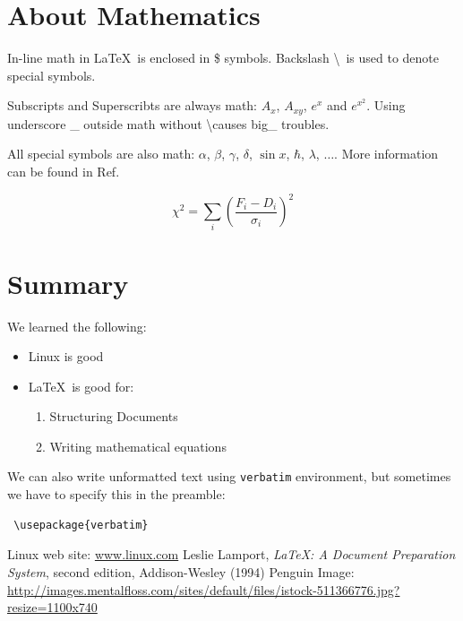 \documentclass[a4paper,10pt,twoside]{article}
\begin{document}
\section{About Mathematics}
\label{sec:math}

In-line math in \LaTeX \ is enclosed in \$ symbols. Backslash \textbackslash \ is used to denote special symbols.

Subscripts and Superscribts are always math: $A_x$, $A_{xy}$, $e^x$ and $e^{x^2}$. Using underscore \_ outside math without 
\textbackslash causes big\_ troubles. 

All special symbols are also math: $\alpha$, $\beta$, $\gamma$, $\delta$, $\sin x$, $\hbar$, $\lambda$, $\ldots$. More information
can be found in Ref.~\cite{latex}

\begin{equation}
\label{eq:chi2}
 \chi^2 = \sum\limits_i \left(\frac{F_i-D_i}{\sigma_i}\right)^2
\end{equation}



\section{Summary}
\label{sec:sum}

We learned the following:
\begin{itemize}
 \item Linux is good
 \item \LaTeX \ is good for:
  \begin{enumerate}
   \item Structuring Documents
   \item Writing mathematical equations
  \end{enumerate}
\end{itemize}

We can also write unformatted text using \texttt{verbatim} environment, but sometimes we have to specify this in the preamble:
\begin{verbatim}
 \usepackage{verbatim}
\end{verbatim}


\begin{thebibliography}{99}
   Linux web site: \url{www.linux.com}
   Leslie Lamport, \textsl{LaTeX: A Document Preparation System}, second edition, Addison-Wesley (1994)
   Penguin Image: \url{http://images.mentalfloss.com/sites/default/files/istock-511366776.jpg?resize=1100x740}
\end{thebibliography}
\end{document}

